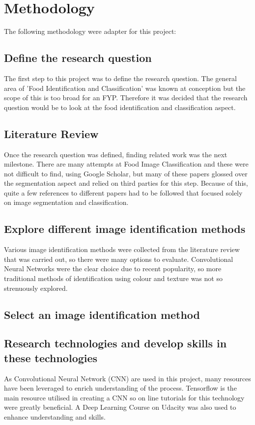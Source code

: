 \section{Methodology}
The following methodology were adapter for this project:

\subsection*{Define the research question}
The first step to this project was to define the research question.
The general area of 'Food Identification and
Classification' was known at conception but the scope of this is too broad for an FYP.
Therefore it was decided that the research question would be to look at the food identification and classification aspect.

\subsection*{Literature Review}
Once the research question was defined, finding related work was the next milestone.
There are many attempts at Food Image Classification and these were not difficult to find, using Google Scholar, but many of these papers glossed over the segmentation aspect and relied on third parties for this step.
Because of this, quite a few references to different papers had to be followed that focused solely on image segmentation and classification.

\subsection*{Explore different image identification methods}
Various image identification methods were collected from the literature review
that was carried out, so there were many options to evaluate.
Convolutional Neural Networks were the clear choice due to recent popularity, so more traditional methods of identification using colour and texture was not so strenuously explored.

\subsection*{Select an image identification method}

\subsection*{Research technologies and develop skills in these technologies}
As Convolutional Neural Network (CNN) are used in this project, many resources have been leveraged to enrich understanding of the process.
Tensorflow is the main resource utilised  in creating a CNN so on line tutorials for this technology were greatly beneficial.
A Deep Learning Course on Udacity was also used to enhance understanding and skills.

